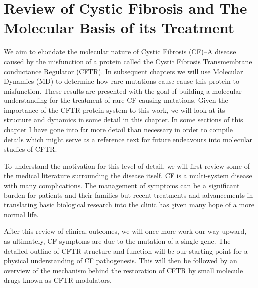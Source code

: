 \chapter{Review of Cystic Fibrosis and The Molecular Basis of its Treatment}
\label{chap:cftr}
\newpage





We aim to elucidate the molecular nature of Cystic Fibrosis (CF)--A disease caused by the misfunction of a protein called the Cystic Fibrosis Transmembrane conductance Regulator (CFTR). In subsequent chapters we will use Molecular Dynamics (MD) to determine how rare mutations cause cause this protein to misfunction. These results are presented with the goal of building a molecular understanding for the treatment of rare CF causing mutations. Given the importance of the CFTR protein system to this work, we will look at its structure and dynamics in some detail in this chapter. In some sections of this chapter I have gone into far more detail than necessary in order to compile details which might serve as a reference text for future endeavours into molecular studies of CFTR. 

To understand the motivation for this level of detail, we will first review some of the medical literature surrounding the disease itself. CF is a multi-system disease with many complications. The management of symptoms can be a significant burden for patients and their families but recent treatments and advancements in translating basic biological research into the clinic has given many hope of a more normal life. 

After this review of clinical outcomes, we will once more work our way upward, as ultimately, CF symptoms are due to the mutation of a single gene. The detailed outline of CFTR structure and function will be our starting point for a physical understanding of CF pathogenesis. This will then be followed by an overview of the mechanism behind the restoration of CFTR by small molecule drugs known as CFTR modulators. 

